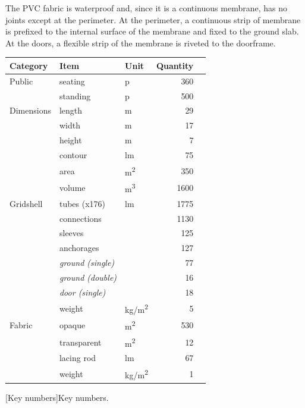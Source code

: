 The PVC fabric is waterproof and, since it is a continuous membrane, has no joints except at the perimeter. At the perimeter, a continuous strip of membrane is prefixed to the internal surface of the membrane and fixed to the ground slab. At the doors, a flexible strip of the membrane is riveted to the doorframe.
\vspace{2cm}
\begin{table}[h]
\centering
{}
 	\begin{tabular}{@{}lllrr@{}}
	\toprule
 	Category	 	& Item 						& Unit 		& Quantity\\ 
	\midrule
	Public  		& seating  					& p					& 360 \\
      				& standing 					& p					& 500 \\
	\midrule
	Dimensions   	&  length						& m 					& 29	\\
	   			&  width 						& m					& 17	\\   			
				&  height 						& m					& 7	\\
				& contour 	 					& lm					& 75\\
				& area						& m\textsuperscript{2}	& 350\\
				&  volume						& m\textsuperscript{3}	& 1600 \\
	\midrule
	Gridshell   	&  tubes (x176)					& lm					& 1775 \\
	   			&  connections					& 					& 1130 \\   			
				&  sleeves						& 					& 125 \\
				& anchorages 					& 					& 127 \\
				& \quad \emph{ground (single)} 	& 					& 77 \\
				& \quad \emph{ground (double)} 	& 					& 16 \\
				& \quad \emph{door (single)} 		& 					& 18 \\
				& weight  						& kg/m\textsuperscript{2} 	& 5 \\
	\midrule
	Fabric   		& opaque						& m\textsuperscript{2}	 & 530 \\
	   			& transparent					& m\textsuperscript{2}	& 12 \\ 
				& lacing rod					& lm 				 	& 67 \\  			
				& weight						& kg/m\textsuperscript{2}	& 1 \\
	\bottomrule
 	\end{tabular}
[Key numbers]{Key numbers.}
\end{table}

